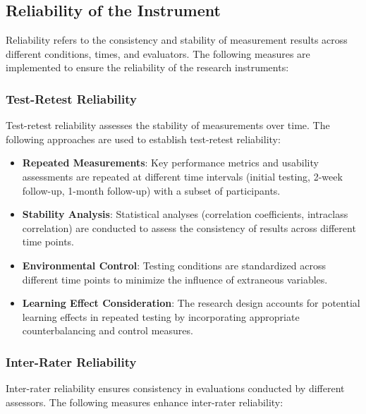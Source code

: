 \documentclass[12pt, a4paper, oneside]{book}
\begin{document}
\subsection{Reliability of the Instrument}

Reliability refers to the consistency and stability of measurement results across different conditions, times, and evaluators. The following measures are implemented to ensure the reliability of the research instruments:

\subsubsection{Test-Retest Reliability}
Test-retest reliability assesses the stability of measurements over time. The following approaches are used to establish test-retest reliability:

\begin{itemize}[leftmargin=*]
    \item \textbf{Repeated Measurements}: Key performance metrics and usability assessments are repeated at different time intervals (initial testing, 2-week follow-up, 1-month follow-up) with a subset of participants.

    \item \textbf{Stability Analysis}: Statistical analyses (correlation coefficients, intraclass correlation) are conducted to assess the consistency of results across different time points.

    \item \textbf{Environmental Control}: Testing conditions are standardized across different time points to minimize the influence of extraneous variables.

    \item \textbf{Learning Effect Consideration}: The research design accounts for potential learning effects in repeated testing by incorporating appropriate counterbalancing and control measures.
\end{itemize}

\subsubsection{Inter-Rater Reliability}
Inter-rater reliability ensures consistency in evaluations conducted by different assessors. The following measures enhance inter-rater reliability:
\end{document}

